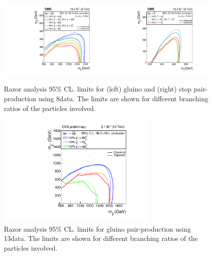 \begin{figure}
 \centering
\includegraphics[width=0.49\textwidth]{RazorVariables/T1HybridNew0Lp1Lp2LBARE.pdf}
\includegraphics[width=0.49\textwidth]{RazorVariables/T2HybridNew0Lp1Lp2LBARE.pdf}
 \caption{Razor analysis 95\% CL. limits for (left) gluino and (right)
   stop pair-production using 8\TeV data. The limits are shown for
   different branching ratios of the particles involved.\label{fig:RazorLimit8TeV}}
\end{figure}

\begin{figure}
 \centering
\includegraphics[width=0.7\textwidth]{RazorVariables/CMS-PAS-SUS-15-004_Figure_010.pdf}
\caption{Razor analysis 95\% CL. limits for gluino pair-production using 13\TeV data. The limits are shown for
   different branching ratios of the particles involved.\label{fig:RazorLimit13TeV}}
\end{figure} 

